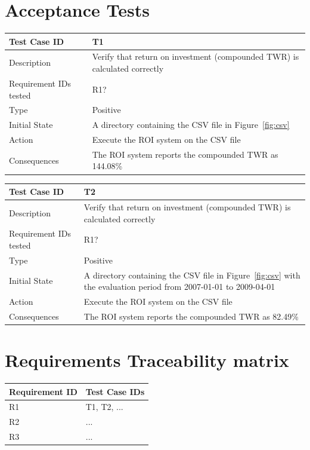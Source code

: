 \documentclass[runningheads,12pt]{article}
\begin{document}
\section{Acceptance Tests}

\bigskip

\noindent
\begin{tabular}{|p{1in}|p{4in}|}
\hline
Test Case ID	 & T1 \\ 
\hline
Description & Verify that return on investment (compounded TWR) is calculated correctly\\
\hline
Requirement IDs tested & R1? \\ 
\hline
Type & Positive \\ 
\hline
Initial State & A directory containing the CSV file in Figure~\ref{fig:csv} \\
\hline 
Action & Execute the ROI system on the CSV file \\
\hline 
Consequences & The ROI system reports the compounded TWR as 144.08\% \\ 
\hline
\end{tabular}

\bigskip
\noindent
\begin{tabular}{|p{1in}|p{4in}|}
\hline
Test Case ID	 & T2 \\ 
\hline
Description & Verify that return on investment (compounded TWR) is calculated correctly\\
\hline
Requirement IDs tested & R1? \\ 
\hline
Type & Positive \\ 
\hline
Initial State & A directory containing the CSV file in Figure~\ref{fig:csv} 
with the evaluation period from 2007-01-01 to 2009-04-01\\
\hline 
Action & Execute the ROI system on the CSV file \\
\hline 
Consequences & The ROI system reports the compounded TWR as 82.49\% \\ 
\hline
\end{tabular}

\section{Requirements Traceability matrix}

\noindent
\begin{tabular}{|p{1.5in}|p{3.5in}|}
\hline
\textbf{Requirement ID}	 & \textbf{Test Case IDs}\\ 
\hline
R1 & T1, T2, ...\\
\hline
R2 & ...\\ 
\hline
R3 & ...\\ 
\hline

\end{tabular}
\end{document}
